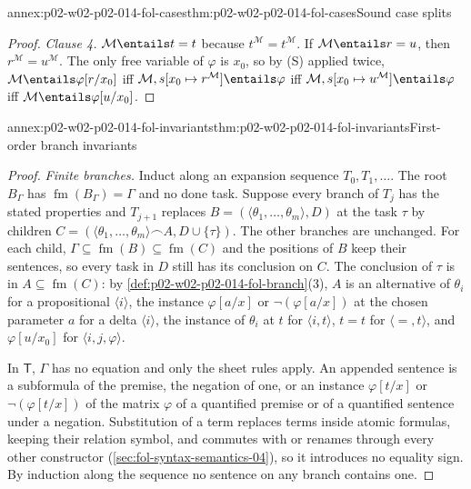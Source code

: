 \begin{annexitem}{annex:p02-w02-p02-014-fol-cases}{thm:p02-w02-p02-014-fol-cases}{Sound case splits}
\begin{proof}
\emph{Clause 4.}  \(\mathcal M\entails t=t\) because
\(t^{\mathcal M}=t^{\mathcal M}\).  If \(\mathcal M\entails r=u\), then
\(r^{\mathcal M}=u^{\mathcal M}\).  The only free variable of \(\varphi\) is
\(x_0\), so by (S) applied twice,
\(\mathcal M\entails\varphi[r/x_0]\) iff
\(\mathcal M,s[x_0\mapsto r^{\mathcal M}]\entails\varphi\) iff
\(\mathcal M,s[x_0\mapsto u^{\mathcal M}]\entails\varphi\) iff
\(\mathcal M\entails\varphi[u/x_0]\).
\end{proof}
\end{annexitem}

\begin{annexitem}{annex:p02-w02-p02-014-fol-invariants}{thm:p02-w02-p02-014-fol-invariants}{First-order branch invariants}
\begin{proof}
\emph{Finite branches.}  Induct along an expansion sequence
\(T_0,T_1,\ldots\).  The root \(B_\Gamma\) has \(\operatorname{fm}(B_\Gamma)=\Gamma\) and
no done task.  Suppose every branch of \(T_j\) has the stated properties and
\(T_{j+1}\) replaces \(B=(\langle\theta_1,\ldots,\theta_m\rangle,D)\) at the
task \(\tau\) by children
\(C=(\langle\theta_1,\ldots,\theta_m\rangle\frown A,D\cup\{\tau\})\).  The
other branches are unchanged.  For each child,
\(\Gamma\subseteq\operatorname{fm}(B)\subseteq\operatorname{fm}(C)\) and the positions of \(B\) keep their
sentences, so every task in \(D\) still has its conclusion on \(C\).  The
conclusion of \(\tau\) is in \(A\subseteq\operatorname{fm}(C)\): by
\cref{def:p02-w02-p02-014-fol-branch}(3), \(A\) is an alternative of
\(\theta_i\) for a propositional \(\langle i\rangle\), the instance
\(\varphi[a/x]\) or \(\neg(\varphi[a/x])\) at the chosen parameter \(a\) for a
delta \(\langle i\rangle\), the instance of \(\theta_i\) at \(t\) for
\(\langle i,t\rangle\), \(t=t\) for \(\langle{=},t\rangle\), and
\(\varphi[u/x_0]\) for \(\langle i,j,\varphi\rangle\).

In \(\mathsf T\), \(\Gamma\) has no equation and only the sheet rules apply.
An appended sentence is a subformula of the premise, the negation of one,
or an instance \(\varphi[t/x]\) or \(\neg(\varphi[t/x])\) of the
matrix \(\varphi\) of a quantified premise or of a quantified sentence under
a negation.  Substitution of a term replaces terms inside atomic formulas,
keeping their relation symbol, and commutes with or renames through every
other constructor (\cref{sec:fol-syntax-semantics-04}), so it introduces no
equality sign.  By induction along the sequence no sentence on any branch
contains one.


\end{proof}
\end{annexitem}
